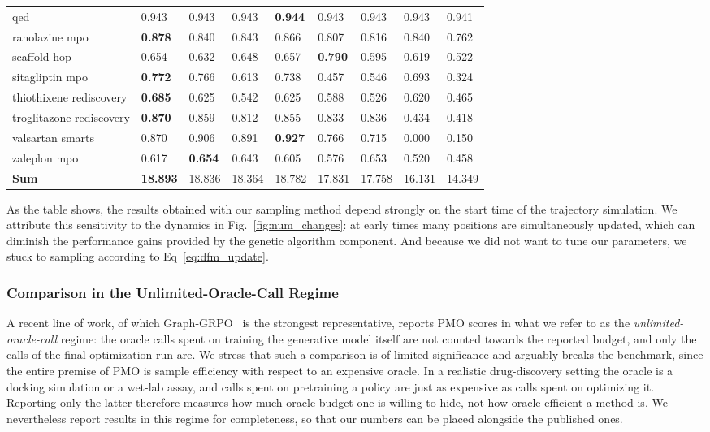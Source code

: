 \documentclass{article} %
\begin{document}
\begin{table}
\begin{tabularx}{\linewidth}{l|Y Y Y Y Y Y Y Y }
\small{qed} & 0.943 & 0.943 & 0.943 & \textbf{0.944} & 0.943 & 0.943 & 0.943 & 0.941 \\
\small{ranolazine mpo} & \textbf{0.878} & 0.840 & 0.843 & 0.866 & 0.807 & 0.816 & 0.840 & 0.762 \\
\small{scaffold hop} & 0.654 & 0.632 & 0.648 & 0.657 & \textbf{0.790} & 0.595 & 0.619 & 0.522 \\
\small{sitagliptin mpo} & \textbf{0.772} & 0.766 & 0.613 & 0.738 & 0.457 & 0.546 & 0.693 & 0.324 \\
\small{thiothixene rediscovery} & \textbf{0.685} & 0.625 & 0.542 & 0.625 & 0.588 & 0.526 & 0.620 & 0.465 \\
\small{troglitazone rediscovery} & \textbf{0.870} & 0.859 & 0.812 & 0.855 & 0.833 & 0.836 & 0.434 & 0.418 \\
\small{valsartan smarts} & 0.870 & 0.906 & 0.891 & \textbf{0.927} & 0.766 & 0.715 & 0.000 & 0.150 \\
\small{zaleplon mpo} & 0.617 & \textbf{0.654} & 0.643 & 0.605 & 0.576 & 0.653 & 0.520 & 0.458 \\
\midrule
\textbf{Sum} & \textbf{18.893} & 18.836 & 18.364 & 18.782 & 17.831 & 17.758 & 16.131 & 14.349 \\
\bottomrule
\end{tabularx}
\end{table}
As the table shows, the results obtained with our sampling method depend strongly on the start time of the trajectory simulation. We attribute this sensitivity to the dynamics in Fig.~\ref{fig:num_changes}: at early times many positions are simultaneously updated, which can diminish the performance gains provided by the genetic algorithm component. And because we did not want to tune our parameters, we stuck to sampling according to Eq~\ref{eq:dfm_update}.
\clearpage
\subsubsection{Comparison in the Unlimited-Oracle-Call Regime}\label{app:unlimited}
A recent line of work, of which Graph-GRPO~\citep{graphgrpo} is the strongest representative, reports PMO scores in what we refer to as the \emph{unlimited-oracle-call} regime: the oracle calls spent on training the generative model itself are not counted towards the reported budget, and only the calls of the final optimization run are. We stress that such a comparison is of limited significance and arguably breaks the benchmark, since the entire premise of PMO is sample efficiency with respect to an expensive oracle. In a realistic drug-discovery setting the oracle is a docking simulation or a wet-lab assay, and calls spent on pretraining a policy are just as expensive as calls spent on optimizing it. Reporting only the latter therefore measures how much oracle budget one is willing to hide, not how oracle-efficient a method is. We nevertheless report results in this regime for completeness, so that our numbers can be placed alongside the published ones.
\end{document}
